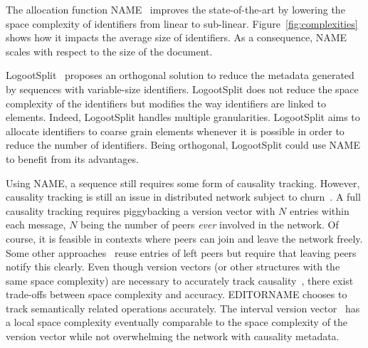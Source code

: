 The allocation function NAME~\cite{nedelec2013lseq,nedelec2013concurrency}
improves the state-of-the-art by lowering the space complexity of identifiers
from linear to sub-linear. Figure~\ref{fig:complexities} shows how it impacts
the average size of identifiers. As a consequence, NAME scales with respect
to the size of the document.

LogootSplit~\cite{andre2013supporting} proposes an orthogonal solution to
reduce the metadata generated by sequences with variable-size
identifiers. LogootSplit does not reduce the space complexity of the
identifiers but modifies the way identifiers are linked to elements. Indeed,
LogootSplit handles multiple granularities. LogootSplit aims to allocate
identifiers to coarse grain elements whenever it is possible in order to reduce
the number of identifiers. Being orthogonal, LogootSplit could use NAME to
benefit from its advantages.

Using NAME, a sequence still requires some form of causality
tracking. However, causality tracking is still an issue in distributed network
subject to churn~\cite{baldoni2002fundamentals}. A full causality tracking
requires piggybacking a version vector with $N$ entries within each message,
$N$ being the number of peers \emph{ever} involved in the network. Of course,
it is feasible in contexts where peers can join and leave the network
freely. Some other approaches~\cite{almeida2008interval} reuse entries of left
peers but require that leaving peers notify this clearly. Even though version
vectors (or other structures with the same space complexity) are necessary to
accurately track causality~\cite{charronbost1991concerning}, there exist
trade-offs between space complexity and accuracy. EDITORNAME chooses to
track semantically related operations accurately. The interval version
vector~\cite{mukund2014optimized} has a local space complexity eventually
comparable to the space complexity of the version vector while not overwhelming
the network with causality metadata.

